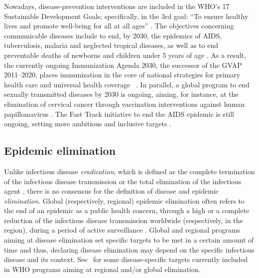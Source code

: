 
Nowadays, disease-prevention interventions are included in the WHO's 17 Sustainable Development Goals; specifically, in the 3rd goal: ``To ensure healthy lives and promote well-being for all at all ages'' \cite[]{SDG_Goal3}. The objectives concerning communicable diseases include to end, by 2030, the epidemics of AIDS, tuberculosis, malaria and neglected tropical diseases, as well as to end preventable deaths of newborns and children under 5 years of age \cite[]{SDG_Goal3}. As a result, the currently ongoing Immunization Agenda 2030, the successor of the GVAP 2011--2020, places immunization in the core of national strategies for primary health care and universal health coverage~ \cite[]{WHO_IA2030}. In parallel, a global program to end sexually transmitted diseases by 2030 is ongoing, aiming, for instance, at the elimination of cervical cancer through vaccination interventions against human papillomavirus \cite[]{WHO_STIs}. The Fast Track initiative to end the AIDS
epidemic is still ongoing, setting more ambitious and inclusive targets \cite[]{UNAIDS_EndAIDS2030}. 


\subsection{Epidemic elimination}  \label{Intro:EpiElim}

Unlike infectious disease \emph{eradication}, which is defined as the complete termination of the infectious disease transmission or the total elimination of the infectious agent \cite[]{Porta2014}, there is no consensus for the definition of disease and epidemic \emph{elimination}. Global (respectively, regional) epidemic elimination often refers to the end of an epidemic as a public health concern, through a high or a complete reduction of the infectious disease transmission worldwide (respectively, in the region), during a period of active surveillance \cite[]{Porta2014,Nishiura2016}. Global and regional programs aiming at disease elimination set specific targets to be met in a certain amount of time and thus, declaring disease elimination may depend on the specific infectious disease and its context. See~ for some disease-specific targets currently included in WHO programs aiming at regional and/or global elimination.


